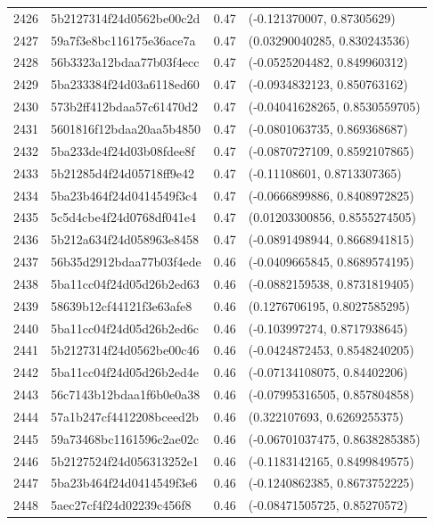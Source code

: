 \begin{table}[ht]
\begin{tabular}{rlrl}
  2426 & 5b2127314f24d0562be00c2d & 0.47 & (-0.121370007, 0.87305629) \\ 
  2427 & 59a7f3e8bc116175e36ace7a & 0.47 & (0.03290040285, 0.830243536) \\ 
  2428 & 56b3323a12bdaa77b03f4ecc & 0.47 & (-0.0525204482, 0.849960312) \\ 
  2429 & 5ba233384f24d03a6118ed60 & 0.47 & (-0.0934832123, 0.850763162) \\ 
  2430 & 573b2ff412bdaa57c61470d2 & 0.47 & (-0.04041628265, 0.8530559705) \\ 
  2431 & 5601816f12bdaa20aa5b4850 & 0.47 & (-0.0801063735, 0.869368687) \\ 
  2432 & 5ba233de4f24d03b08fdee8f & 0.47 & (-0.0870727109, 0.8592107865) \\ 
  2433 & 5b21285d4f24d05718ff9e42 & 0.47 & (-0.11108601, 0.8713307365) \\ 
  2434 & 5ba23b464f24d0414549f3c4 & 0.47 & (-0.0666899886, 0.8408972825) \\ 
  2435 & 5c5d4cbe4f24d0768df041e4 & 0.47 & (0.01203300856, 0.8555274505) \\ 
  2436 & 5b212a634f24d058963e8458 & 0.47 & (-0.0891498944, 0.8668941815) \\ 
  2437 & 56b35d2912bdaa77b03f4ede & 0.46 & (-0.0409665845, 0.8689574195) \\ 
  2438 & 5ba11cc04f24d05d26b2ed63 & 0.46 & (-0.0882159538, 0.8731819405) \\ 
  2439 & 58639b12cf44121f3e63afe8 & 0.46 & (0.1276706195, 0.8027585295) \\ 
  2440 & 5ba11cc04f24d05d26b2ed6c & 0.46 & (-0.103997274, 0.8717938645) \\ 
  2441 & 5b2127314f24d0562be00c46 & 0.46 & (-0.0424872453, 0.8548240205) \\ 
  2442 & 5ba11cc04f24d05d26b2ed4e & 0.46 & (-0.07134108075, 0.84402206) \\ 
  2443 & 56c7143b12bdaa1f6b0e0a38 & 0.46 & (-0.07995316505, 0.857804858) \\ 
  2444 & 57a1b247cf4412208bceed2b & 0.46 & (0.322107693, 0.6269255375) \\ 
  2445 & 59a73468bc1161596c2ae02c & 0.46 & (-0.06701037475, 0.8638285385) \\ 
  2446 & 5b2127524f24d056313252e1 & 0.46 & (-0.1183142165, 0.8499849575) \\ 
  2447 & 5ba23b464f24d0414549f3e6 & 0.46 & (-0.1240862385, 0.8673752225) \\ 
  2448 & 5aec27cf4f24d02239c456f8 & 0.46 & (-0.08471505725, 0.85270572) \\ 

\end{tabular}
\end{table}
